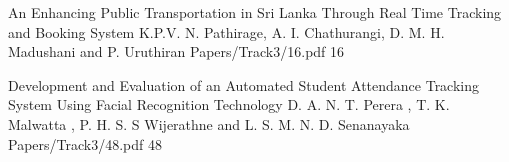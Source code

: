





   \addpaper
    	{An Enhancing Public Transportation in Sri Lanka Through Real Time Tracking and Booking System}
   		 {K.P.V. N. Pathirage, A. I. Chathurangi, D. M. H. Madushani and P. Uruthiran} 
   		 {Papers/Track3/16.pdf}
        {16}







    \addpaper
    	{Development and Evaluation of an Automated Student Attendance Tracking System Using Facial Recognition Technology}
   		 {D. A. N. T. Perera , T. K. Malwatta , P. H. S. S Wijerathne and L. S. M. N. D.
Senanayaka} 
   		 {Papers/Track3/48.pdf}
        {48}

